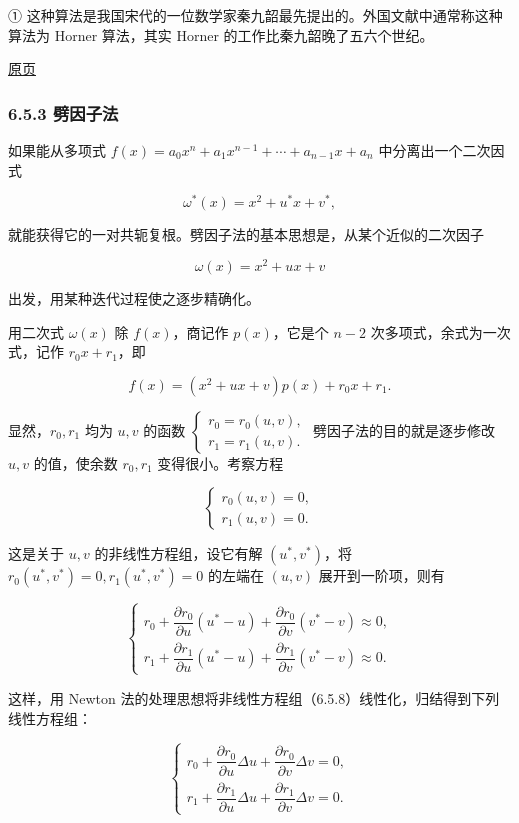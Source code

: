 \documentclass[
  10pt,
  fontset=fandol]{ctexart}
\begin{document}
① 这种算法是我国宋代的一位数学家秦九韶最先提出的。外国文献中通常称这种算法为 Horner 算法，其实 Horner 的工作比秦九韶晚了五六个世纪。

\href{../../source-images/pdf-173.jpeg}{原页}

\subsubsection{6.5.3 劈因子法}\label{ux5288ux56e0ux5b50ux6cd5}

如果能从多项式 \(f(x)=a_0x^n+a_1x^{n-1}+\cdots+a_{n-1}x+a_n\) 中分离出一个二次因式

\[
\omega^*(x)=x^2+u^*x+v^*,
\]

就能获得它的一对共轭复根。劈因子法的基本思想是，从某个近似的二次因子

\[
\omega(x)=x^2+ux+v
\]

出发，用某种迭代过程使之逐步精确化。

用二次式 \(\omega(x)\) 除 \(f(x)\)，商记作 \(p(x)\)，它是个 \(n-2\) 次多项式，余式为一次式，记作 \(r_0x+r_1\)，即

\[
f(x)=(x^2+ux+v)p(x)+r_0x+r_1.
\tag{6.5.7}
\]

显然，\(r_0,r_1\) 均为 \(u,v\) 的函数 \(\begin{cases}r_0=r_0(u,v),\\r_1=r_1(u,v).\end{cases}\) 劈因子法的目的就是逐步修改 \(u,v\) 的值，使余数 \(r_0,r_1\) 变得很小。考察方程

\[
\begin{cases}
r_0(u,v)=0,\\
r_1(u,v)=0.
\end{cases}
\tag{6.5.8}
\]

这是关于 \(u,v\) 的非线性方程组，设它有解 \((u^*,v^*)\)，将 \(r_0(u^*,v^*)=0,r_1(u^*,v^*)=0\) 的左端在 \((u,v)\) 展开到一阶项，则有

\[
\begin{cases}
r_0+\dfrac{\partial r_0}{\partial u}(u^*-u)+\dfrac{\partial r_0}{\partial v}(v^*-v)\approx0,\\
r_1+\dfrac{\partial r_1}{\partial u}(u^*-u)+\dfrac{\partial r_1}{\partial v}(v^*-v)\approx0.
\end{cases}
\]

这样，用 Newton 法的处理思想将非线性方程组（6.5.8）线性化，归结得到下列线性方程组：

\[
\begin{cases}
r_0+\dfrac{\partial r_0}{\partial u}\Delta u+\dfrac{\partial r_0}{\partial v}\Delta v=0,\\
r_1+\dfrac{\partial r_1}{\partial u}\Delta u+\dfrac{\partial r_1}{\partial v}\Delta v=0.
\end{cases}
\tag{6.5.9}
\]
\end{document}
